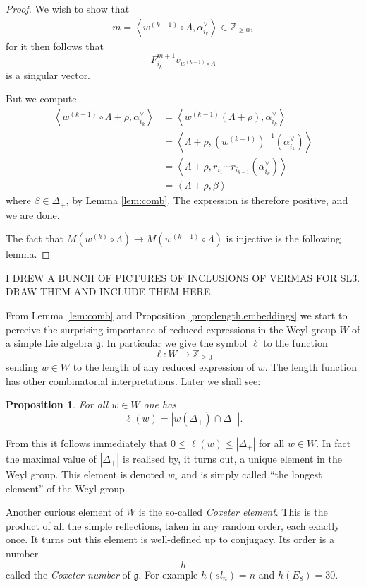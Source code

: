 \documentclass[12pt]{article}
\theoremstyle{plain}
\newtheorem{prop}[thm]{Proposition}
\theoremstyle{definition}
\numberwithin{equation}{section}
\newcommand{\al}{\alpha}
\newcommand{\La}{\Lambda}
\newcommand{\D}{\Delta}
\newcommand{\Z}{\mathbb{Z}}
\newcommand{\g}{\mathfrak{g}}
\begin{document}
\begin{proof}
We wish to show that
\begin{align*}
m = \left< w^{(k-1)} \circ \La, \al_{i_k}^\vee \right> \in \Z_{\geq 0},
\end{align*}
for it then follows that
\[
F_{i_k}^{m+1} v_{w^{(k-1)} \circ \La}
\]
is a singular vector.

But we compute
\begin{align*}
\left< w^{(k-1)} \circ \La + \rho, \al_{i_k}^\vee \right>
%
&= \left< w^{(k-1)} (\La + \rho), \al_{i_k}^\vee \right> \\
%
&= \left< \La + \rho, (w^{(k-1)})^{-1}(\al_{i_k}^\vee) \right> \\
%
&= \left< \La + \rho, r_{i_{1}} \cdots r_{i_{k-1}}(\al_{i_k}^\vee) \right> \\
%
&= \left< \La + \rho, \beta \right>
\end{align*}
where $\beta \in \D_+$, by Lemma \ref{lem:comb}. The expression is therefore positive, and we are done.

The fact that $M(w^{(k)} \circ \La) \rightarrow M(w^{(k-1)} \circ \La)$ is injective is the following lemma.
\end{proof}




{\color{blue}I DREW A BUNCH OF PICTURES OF INCLUSIONS OF VERMAS FOR SL3. DRAW THEM AND INCLUDE THEM HERE.}

From Lemma \ref{lem:comb} and Proposition \ref{prop:length.embeddings} we start to perceive the surprising importance of reduced expressions in the Weyl group $W$ of a simple Lie algebra $\g$. In particular we give the symbol $\ell$ to the function
\[
\ell : W \rightarrow \Z_{\geq 0}
\]
sending $w \in W$ to the length of any reduced expression of $w$. The length function has other combinatorial interpretations. Later we shall see:
\begin{prop}\label{prop:wD+D-ell}
For all $w \in W$ one has
\[
\ell(w) = |w(\D_+) \cap \D_-|.
\]
\end{prop}
From this it follows immediately that $0 \leq \ell(w) \leq |\D_+|$ for all $w \in W$. In fact the maximal value of $|\D_+|$ is realised by, it turns out, a unique element in the Weyl group. This element is denoted $w_\circ$ and is simply called ``the longest element'' of the Weyl group.

Another curious element of $W$ is the so-called \emph{Coxeter element}. This is the product of all the simple reflections, taken in any random order, each exactly once. It turns out this element is well-defined up to conjugacy. Its order is a number
\[
h
\]
called the \emph{Coxeter number} of $\g$. For example $h(sl_n) = n$ and $h(E_8) = 30$.
\end{document}
